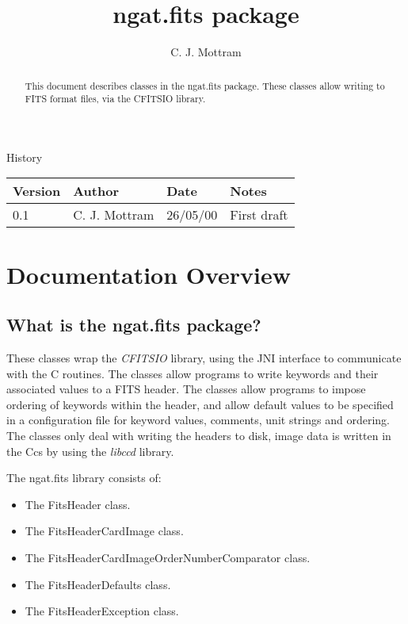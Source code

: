 \documentclass[10pt,a4paper]{article}
\title{ngat.fits package}
\author{C. J. Mottram}
\date{}
\begin{document}
\thispagestyle{empty}
\maketitle
\begin{abstract}
This document describes classes in the ngat.fits package.
These classes allow writing to FITS format files, via the CFITSIO library.
\end{abstract}

\centerline{\Large History}
\begin{center}
\begin{tabular}{|l|l|l|p{15em}|}
\hline
{\bf Version} & {\bf Author} & {\bf Date} & {\bf Notes} \\
\hline
0.1 &              C. J. Mottram & 26/05/00 & First draft \\
\hline
\end{tabular}
\end{center}

\newpage
\tableofcontents
\listoffigures
\listoftables
\newpage

\section{Documentation Overview}
\subsection{What is the ngat.fits package?}
These classes wrap the {\em CFITSIO} library, using the JNI interface to communicate with the C routines.
The classes allow programs to write keywords and their associated values to a FITS header. 
The classes allow programs to impose ordering of keywords within the header, and allow default values to
be specified in a configuration file for keyword values, comments, unit strings and ordering. The classes
only deal with writing the headers to disk, image data is written in the Ccs by using the {\em libccd}
library.

The ngat.fits library consists of:
\begin{itemize}
\item The FitsHeader class.
\item The FitsHeaderCardImage class.
\item The FitsHeaderCardImageOrderNumberComparator class.
\item The FitsHeaderDefaults class.
\item The FitsHeaderException class.
\end{itemize}
 
\end{document}
